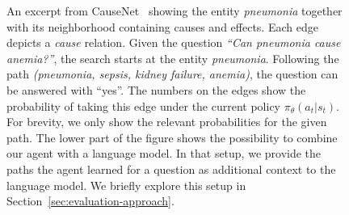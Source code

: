 \begin{figure}
    \caption{An excerpt from CauseNet~\cite{Heindorf2020Causenet} showing the entity \textit{pneumonia} together with its neighborhood containing causes and effects. 
            Each edge depicts a \textit{cause} relation. Given the question \textit{``Can pneumonia cause anemia?''}, the search
            starts at the entity \textit{pneumonia}. Following the path \textit{(pneumonia, sepsis, kidney failure, anemia)}, the question 
            can be answered with ``yes''. The numbers on the edges show the probability of taking this edge under the current 
            policy $\pi_{\theta}(a_t | s_t)$. For brevity, we only show the relevant probabilities for the given path. The lower part of the figure shows the possibility to combine our agent with a language model. In that setup, we provide the paths the agent learned for a question as additional context 
            to the language model. We briefly explore this setup in Section~\ref{sec:evaluation-approach}.
            }
    \label{fig:graph_example}
\end{figure}